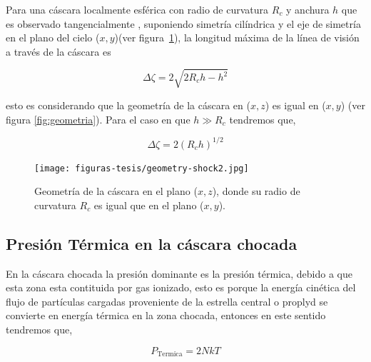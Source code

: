 Para una cáscara localmente esférica con radio de curvatura \(R_{c}\) y anchura \(h\) que es observado tangencialmente \citeauthor{Henney:2013a}, suponiendo simetría cilíndrica y el eje de simetría en el plano del cielo (\(x, y\))(ver figura~\ref{fig:geometria1}), la longitud máxima de la línea de visión a través de la cáscara es


\begin{equation}
  \label{eq:line-singht}
   \Delta \zeta = 2\sqrt{2R_{c}h -h^{2}}
\end{equation}

 esto es considerando que la geometría de la cáscara en (\(x, z\)) es igual en (\(x, y\)) (ver figura  \ref{fig:geometria}). Para el caso en que \(h \gg R_{c}\) tendremos que,

\begin{equation}
  \label{eq:vision}
  \Delta \zeta = 2(R_{c}h)^{1/2}
\end{equation}

\begin{figure}
  \centering
  \texttt{[image: figuras-tesis/geometry-shock2.jpg]}
  \caption{Geometría de la cáscara en el plano (\(x, z\)), donde su radio de curvatura \(R_{c}\) es igual que en el plano (\(x, y\)).}
  \label{fig:geometria1}
\end{figure}

\subsection{Presión Térmica en la cáscara chocada}
\label{sec:pressur-thermal}

En la cáscara chocada la presión dominante es la presión térmica, debido a que esta zona esta contituida por gas ionizado, esto es porque la energía cinética del flujo de partículas cargadas proveniente de la estrella central o proplyd se convierte en energía térmica en la zona chocada, entonces en este sentido tendremos que,

\begin{equation}
  \label{eq:presion-cascara}
  P_{\text{Termica}} = 2 N k T 
\end{equation}
 
